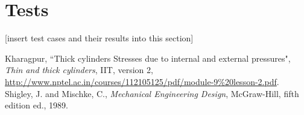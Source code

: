 \documentclass{article}
\begin{document}
\section{Tests}
[insert test cases and their results into this section]

\begin{thebibliography}{9}

 Kharagpur, ``Thick cylinders Stresses due to internal and external pressures", \emph{Thin and thick cylinders}, IIT, version 2, \url{http://www.nptel.ac.in/courses/112105125/pdf/module-9\%20lesson-2.pdf}.
 Shigley, J. and Mischke, C., \emph{Mechanical Engineering Design}, McGraw-Hill, fifth edition ed., 1989.

\end{thebibliography}
\end{document}
